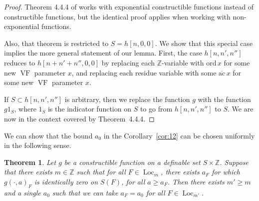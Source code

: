 \documentclass[12pt]{amsart}
\newcommand{\op}[1]{\operatorname{#1}}
\newcommand{\ring}[1]{{\mathbb #1}}
\def\VF{{\op{VF}}}
\newcommand\ord{\mathrm{ord}}
\newcommand\ac{\overline{\mathrm{ac}}}
\theoremstyle{plain}
\newtheorem{thm}{Theorem}
\theoremstyle{definition}
\begin{document}
\begin{proof}  Theorem 4.4.4 of \cite{CGH} works with exponential
  constructible functions instead of constructible functions, but the
  identical proof applies when working with non-exponential functions.

  Also, that theorem is restricted to $S=h[n,0,0]$.  We show that
  this special case implies the more general statement of our lemma.
  First, the case $h[n,n',n'']$ reduces to $h[n+n'+n'',0,0]$ by
  replacing each $\ring{Z}$-variable with $\ord\, x$ for some new $\VF$
  parameter $x$, and replacing each residue variable with some $\ac\, x$
  for some new $\VF$ parameter $x$.

  If $S\subset h[n,n',n'']$ is arbitrary, then we replace the function
  $g$ with the function $g 1_S$, where $1_S$ is the indicator function
  on $S$ to go from $h[n,n',n'']$ to $S$.  We are now in the context
  covered by Theorem~4.4.4.
\end{proof}


We can show that the bound $a_0$ in the Corollary~\ref{cor:12}
can be chosen uniformly in the following sense.

\begin{thm}\label{thm:uniform}
  Let $g$ be a constructible function on a definable set
  $S\times\ring{Z}$.  Suppose that there exists $m\in\ring{Z}$ such
  that for all $F\in \op{Loc}_m$, there exists $a_F$ for which
  $g(\cdot,a)_F$ is identically zero on $S(F)$, for all $a\ge a_F$.
  Then there exists $m'\ge m$ and a single $a_0$ such that we can take
  $a_F=a_0$ for all $F\in \op{Loc}_{m'}$.
\end{thm}
\end{document}
